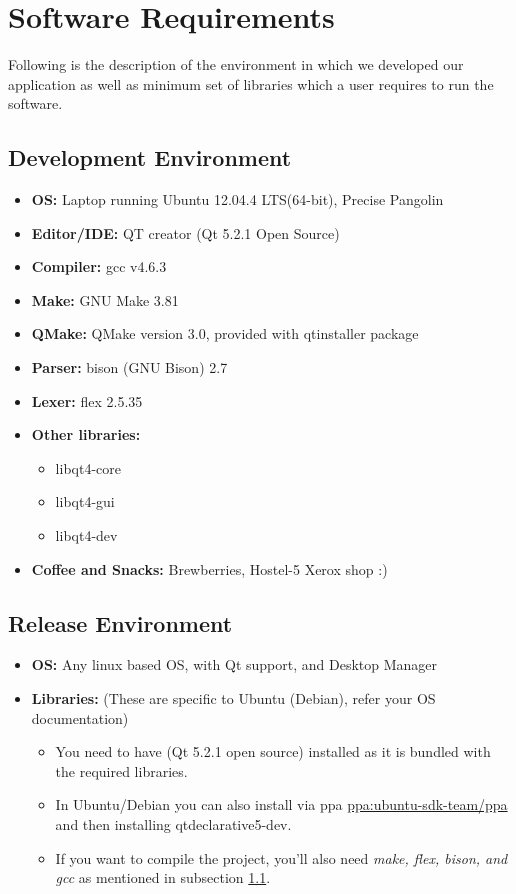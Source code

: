 \section{Software Requirements}
\label{softreq}
\par{Following is the description of the environment in which we developed our application as well as minimum set of libraries which a user requires to run the software.}
\subsection{Development Environment}
\label{devel}
\begin{itemize}
 \item \textbf{OS:} Laptop running Ubuntu 12.04.4 LTS(64-bit), Precise Pangolin
 \item \textbf{Editor/IDE:} QT creator (Qt 5.2.1 Open Source) \cite{4}
 \item \textbf{Compiler:} gcc v4.6.3
 \item \textbf{Make:} GNU Make 3.81
 \item \textbf{QMake:} QMake version 3.0, provided with qtinstaller package
 \item \textbf{Parser:} bison (GNU Bison) 2.7 \cite{1}
 \item \textbf{Lexer:} flex 2.5.35 \cite{5}
 \item \textbf{Other libraries: }
 \begin{itemize}
    \item libqt4-core
    \item libqt4-gui
    \item libqt4-dev
 \end{itemize}  
 \item \textbf{Coffee and Snacks: } Brewberries, Hostel-5 Xerox shop :) 
\end{itemize}
\subsection{Release Environment}
\label{release}
\begin{itemize}
 \item \textbf{OS:} Any linux based OS, with Qt support, and Desktop Manager
 \item \textbf{Libraries:} (These are specific to Ubuntu (Debian), refer your OS documentation) 
 \begin{itemize}
  \item You need to have (Qt 5.2.1 open source) installed as it is bundled with the required libraries.
  \item In Ubuntu/Debian you can also install via ppa \url{ppa:ubuntu-sdk-team/ppa} and then installing qtdeclarative5-dev.
  \item If you want to compile the project, you'll also need \emph{make, flex, bison, and gcc} as mentioned in subsection \ref{devel}.
 \end{itemize}
\end{itemize}
